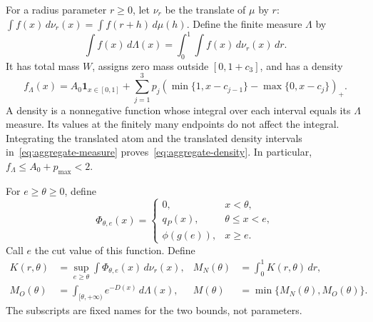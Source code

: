 \documentclass[11pt]{article}
\numberwithin{equation}{section}
\theoremstyle{definition}
\newcommand{\ind}{\mathbf 1}
\newcommand{\pos}[1]{\left(#1\right)_{+}}
\begin{document}
For a radius parameter $r\ge0$, let $\nu_r$ be the translate of $\mu$ by $r$:
$\int f(x)\,d\nu_r(x)=\int f(r+h)\,d\mu(h)$.
Define the finite measure $\Lambda$ by
\begin{equation}\label{eq:aggregate-measure}
 \int f(x)\,d\Lambda(x)=\int_0^1\int f(x)\,d\nu_r(x)\,dr.
\end{equation}
It has total mass $W$, assigns zero mass outside $[0,1+c_3]$, and has a density
\begin{equation}\label{eq:aggregate-density}
 f_\Lambda(x)=A_0\ind_{x\in[0,1]}
 +\sum_{j=1}^3p_j
   \pos{\min\{1,x-c_{j-1}\}-\max\{0,x-c_j\}}.
\end{equation}
A density is a nonnegative function whose integral over each interval
equals its $\Lambda$ measure. Its values at the finitely many endpoints
do not affect the integral. Integrating the translated atom and the
translated density intervals in~\eqref{eq:aggregate-measure}
proves~\eqref{eq:aggregate-density}.
In particular, $f_\Lambda\le A_0+p_{\max}<2$.

For $e\ge\theta\ge0$, define
\begin{equation}\label{eq:reward}
 \Phi_{\theta,e}(x)=
 \begin{cases}
  0,&x<\theta,\\
  q_P(x),&\theta\le x<e,\\
  \phi(g(e)),&x\ge e.
 \end{cases}
\end{equation}
Call $e$ the cut value of this function. Define
\begin{align}
 K(r,\theta)&=\sup_{e\ge\theta}\int\Phi_{\theta,e}(x)\,d\nu_r(x),
       &M_N(\theta)&=\int_0^1K(r,\theta)\,dr,\label{eq:new-envelope}\\
 M_O(\theta)&=\int_{[\theta,+\infty)}e^{-D(x)}\,d\Lambda(x),
       &M(\theta)&=\min\{M_N(\theta),M_O(\theta)\}.
       \label{eq:old-envelope}
\end{align}
The subscripts are fixed names for the two bounds, not parameters.
\end{document}
